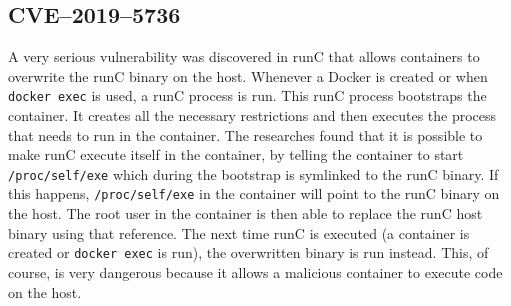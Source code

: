 \subsection{CVE--2019--5736}
A very serious vulnerability was discovered in runC that allows containers to overwrite the runC binary on the host. Whenever a Docker is created or when \lstinline{docker exec} is used, a runC process is run. This runC process bootstraps the container. It creates all the necessary restrictions and then executes the process that needs to run in the container. The researches found that it is possible to make runC execute itself in the container, by telling the container to start \lstinline{/proc/self/exe} which during the bootstrap is symlinked to the runC binary\cite{CVE-2019-5736-DragonSector}\cite{CVE-2019-5736-Github}. If this happens, \lstinline{/proc/self/exe} in the container will point to the runC binary on the host. The root user in the container is then able to replace the runC host binary using that reference. The next time runC is executed (a container is created or \lstinline{docker exec} is run), the overwritten binary is run instead. This, of course, is very dangerous because it allows a malicious container to execute code on the host.
